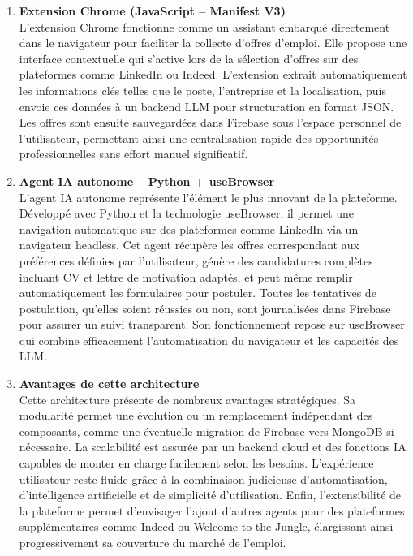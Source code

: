 \begin{enumerate}
    \item \textbf{Extension Chrome (JavaScript – Manifest V3)} \\
L'extension Chrome fonctionne comme un assistant embarqué directement dans le navigateur pour faciliter la collecte d'offres d'emploi. Elle propose une interface contextuelle qui s'active lors de la sélection d'offres sur des plateformes comme LinkedIn ou Indeed. L'extension extrait automatiquement les informations clés telles que le poste, l'entreprise et la localisation, puis envoie ces données à un backend LLM pour structuration en format JSON. Les offres sont ensuite sauvegardées dans Firebase sous l'espace personnel de l'utilisateur, permettant ainsi une centralisation rapide des opportunités professionnelles sans effort manuel significatif.\\


    \item \textbf{Agent IA autonome – Python + useBrowser} \\
L'agent IA autonome représente l'élément le plus innovant de la plateforme. Développé avec Python et la technologie useBrowser, il permet une navigation automatique sur des plateformes comme LinkedIn via un navigateur headless. Cet agent récupère les offres correspondant aux préférences définies par l'utilisateur, génère des candidatures complètes incluant CV et lettre de motivation adaptés, et peut même remplir automatiquement les formulaires pour postuler. Toutes les tentatives de postulation, qu'elles soient réussies ou non, sont journalisées dans Firebase pour assurer un suivi transparent. Son fonctionnement repose sur useBrowser qui combine efficacement l'automatisation du navigateur et les capacités des LLM.\\

    \item \textbf{Avantages de cette architecture}\\
Cette architecture présente de nombreux avantages stratégiques. Sa modularité permet une évolution ou un remplacement indépendant des composants, comme une éventuelle migration de Firebase vers MongoDB si nécessaire. La scalabilité est assurée par un backend cloud et des fonctions IA capables de monter en charge facilement selon les besoins. L'expérience utilisateur reste fluide grâce à la combinaison judicieuse d'automatisation, d'intelligence artificielle et de simplicité d'utilisation. Enfin, l'extensibilité de la plateforme permet d'envisager l'ajout d'autres agents pour des plateformes supplémentaires comme Indeed ou Welcome to the Jungle, élargissant ainsi progressivement sa couverture du marché de l'emploi.\\

\end{enumerate}

